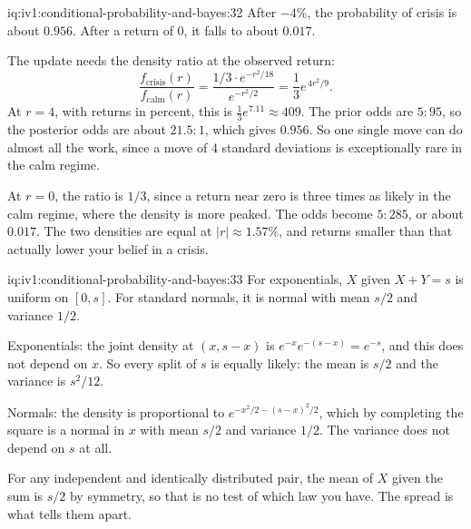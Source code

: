 \begin{solution}{iq:iv1:conditional-probability-and-bayes:32}
After $-4\%$, the probability of crisis is about $0.956$. After a return of 0, it falls to about $0.017$.

The update needs the density ratio at the observed return:
\[
\frac{f_{\text{crisis}}(r)}{f_{\text{calm}}(r)} = \frac{1/3 \cdot e^{-r^2/18}}{e^{-r^2/2}} = \frac13 e^{\,4r^2/9}.
\]
At $r = 4$, with returns in percent, this is $\tfrac13 e^{7.11} \approx 409$. The prior odds are $5 : 95$, so the posterior odds are about $21.5 : 1$, which gives $0.956$. So one single move can do almost all the work, since a move of 4 standard deviations is exceptionally rare in the calm regime.

At $r = 0$, the ratio is $1/3$, since a return near zero is three times as likely in the calm regime, where the density is more peaked. The odds become $5 : 285$, or about $0.017$. The two densities are equal at $|r| \approx 1.57\%$, and returns smaller than that actually lower your belief in a crisis.

\end{solution}

\begin{solution}{iq:iv1:conditional-probability-and-bayes:33}
For exponentials, $X$ given $X + Y = s$ is uniform on $[0, s]$. For standard normals, it is normal with mean $s/2$ and variance $1/2$.

Exponentials: the joint density at $(x, s - x)$ is $e^{-x} e^{-(s - x)} = e^{-s}$, and this does not depend on $x$. So every split of $s$ is equally likely: the mean is $s/2$ and the variance is $s^2/12$.

Normals: the density is proportional to $e^{-x^2/2 - (s-x)^2/2}$, which by completing the square is a normal in $x$ with mean $s/2$ and variance $1/2$. The variance does not depend on $s$ at all.

For any independent and identically distributed pair, the mean of $X$ given the sum is $s/2$ by symmetry, so that is no test of which law you have. The spread is what tells them apart.

\end{solution}

